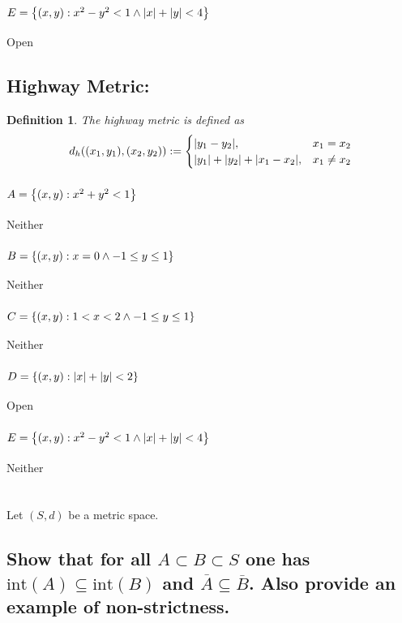 \documentclass[]{article}
\newtheorem{definition}{Definition}
\begin{document}
\subsubsection{$E = \qty{(x,y) : x^2 - y^2 < 1 \land \abs{x} + \abs{y} < 4}$}
Open


\subsection{Highway Metric:}
\begin{definition}
    The highway metric is defined as 
    \begin{displaymath}
        d_h((x_1,y_1),(x_2,y_2)) := 
        \begin{cases}
            \abs{y_1 - y_2}, &x_1 = x_2\\
            \abs{y_1} + \abs{y_2} + \abs{x_1 - x_2}, &x_1 \neq x_2
        \end{cases}
    \end{displaymath}
\end{definition}

\subsubsection{$A = \qty{(x,y) : x^2 + y^2 < 1}$}
Neither
\subsubsection{$B = \qty{(x,y) : x = 0 \land -1 \leq y \leq 1}$}
Neither
\subsubsection{$C = \qty{(x,y) : 1 < x < 2 \land -1 \leq y \leq 1}$}
Neither
\subsubsection{$D = \qty{(x,y) : \abs{x} + \abs{y} < 2}$}
Open
\subsubsection{$E = \qty{(x,y) : x^2 - y^2 < 1 \land \abs{x} + \abs{y} < 4}$}
Neither



\newpage
\section{}
Let $(S,d)$ be a metric space.
\subsection{Show that for all $A \subset B \subset S$ 
one has $\text{int}(A)\subseteq \text{int}(B)$ and $\overline{A}\subseteq\overline{B}$. 
Also provide an example of non-strictness.}
\end{document}
